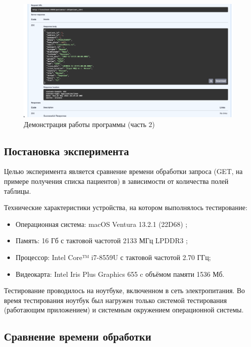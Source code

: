 \begin{figure}[h]
	\centering
	\captionsetup{justification=centering}
 	\includegraphics[width=152mm]{img/example-2.png}
	\caption{Демонстрация  работы  программы  (часть 2)}
	\label{fig:example-2}
\end{figure}

\subsection{Постановка эксперимента}

Целью эксперимента является сравнение времени обработки запроса \linebreak (GET, на примере получения списка пациентов) в зависимости от количества полей таблицы.

\clearpage

Технические характеристики устройства, на котором выполнялось тестирование:

\begin{itemize}[label=---]
	\item Операционная система: macOS Ventura 13.2.1 (22D68) \cite{macos};
	\item Память: 16 Гб с тактовой частотой 2133 МГц LPDDR3 \cite{memory};
	\item Процессор: Intel Core™ i7-8559U \cite{intel} с тактовой частотой  2.70 ГГц;
	\item Видеокарта: Intel Iris Plus Graphics 655 \cite{graphics} c объёмом памяти 1536 Мб.
\end{itemize}

Тестирование проводилось на ноутбуке, включенном в сеть электропитания. Во время тестирования ноутбук был нагружен только системой тестирования (работающим приложением) и системным окружением операционной системы.

\subsection{Сравнение времени обработки}

